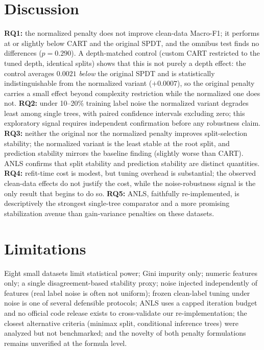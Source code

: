 \documentclass[conference]{IEEEtran}
\begin{document}
\section{Discussion}
\textbf{RQ1:} the normalized penalty does not improve clean-data
Macro-F1; it performs at or slightly below CART and the original SPDT,
and the omnibus test finds no differences ($p=0.290$). A depth-matched
control (custom CART restricted to the tuned depth, identical splits)
shows that this is not purely a depth effect: the control averages
$0.0021$ \emph{below} the original SPDT and is statistically
indistinguishable from the normalized variant ($+0.0007$), so the
original penalty carries a small effect beyond complexity restriction
while the normalized one does not.
\textbf{RQ2:} under 10--20\% training label noise the normalized
variant degrades least among single trees, with paired confidence
intervals excluding zero; this exploratory signal requires independent
confirmation before any robustness claim.
\textbf{RQ3:} neither the original nor the normalized penalty improves
split-selection stability; the normalized variant is the least stable
at the root split, and prediction stability mirrors the baseline
finding (slightly worse than CART). ANLS confirms that split stability
and prediction stability are distinct quantities.
\textbf{RQ4:} refit-time cost is modest, but tuning overhead is
substantial; the observed clean-data effects do not justify the cost,
while the noise-robustness signal is the only result that begins to do
so.
\textbf{RQ5:} ANLS, faithfully re-implemented, is descriptively the
strongest single-tree comparator and a more promising stabilization
avenue than gain-variance penalties on these datasets.

\section{Limitations}
Eight small datasets limit statistical power; Gini impurity only;
numeric features only; a single disagreement-based stability proxy;
noise injected independently of features (real label noise is often
not uniform); frozen clean-label tuning under noise is one of several
defensible protocols; ANLS uses a capped iteration budget and no
official code release exists to cross-validate our re-implementation;
the closest
alternative criteria (minimax split, conditional inference trees) were
analyzed but not benchmarked; and the novelty of both penalty
formulations remains unverified at the formula level.
\end{document}

